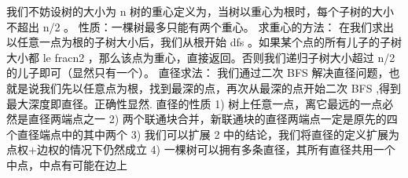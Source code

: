 {}
\markdownRendererSectionEnd \markdownRendererSectionBegin
{}\markdownRendererInterblockSeparator
{}\markdownRendererSectionBegin
{}\markdownRendererInterblockSeparator
{}我们不妨设树的大小为\markdownRendererDollarSign{} n \markdownRendererDollarSign{}\markdownRendererParagraphSeparator
{}树的重心定义为，当树以重心为根时，每个子树的大小不超出\markdownRendererDollarSign{} n/2 \markdownRendererDollarSign{}。\markdownRendererParagraphSeparator
{}性质：一棵树最多只能有两个重心。\markdownRendererParagraphSeparator
{}求重心的方法：\markdownRendererParagraphSeparator
{}在我们求出以任意一点为根的子树大小后，我们从根开始\markdownRendererDollarSign{} dfs \markdownRendererDollarSign{}。如果某个点的所有儿子的子树大小都\markdownRendererDollarSign{} \markdownRendererBackslash{}le \markdownRendererBackslash{}frac\markdownRendererLeftBrace{}n\markdownRendererRightBrace{}\markdownRendererLeftBrace{}2\markdownRendererRightBrace{} \markdownRendererDollarSign{}，那么该点为重心，直接返回。否则我们递归子树大小超过\markdownRendererDollarSign{} n/2 \markdownRendererDollarSign{}的儿子即可（显然只有一个）。\markdownRendererInterblockSeparator
{}\markdownRendererInterblockSeparator
{}
\markdownRendererSectionEnd \markdownRendererSectionBegin
{}\markdownRendererInterblockSeparator
{}直径求法：\markdownRendererParagraphSeparator
{}我们通过二次\markdownRendererDollarSign{} BFS \markdownRendererDollarSign{}解决直径问题，也就是说我们先以任意点为根，找到最深的点，再次从最深的点开始二次\markdownRendererDollarSign{} BFS\markdownRendererSoftLineBreak
{}\markdownRendererDollarSign{},得到最大深度即直径。正确性显然.\markdownRendererInterblockSeparator
{}\markdownRendererInterblockSeparator
{}直径的性质\markdownRendererParagraphSeparator
{}\markdownRendererDollarSign{} 1) \markdownRendererDollarSign{}树上任意一点，离它最远的一点必然是直径两端点之一\markdownRendererParagraphSeparator
{}\markdownRendererDollarSign{} 2) \markdownRendererDollarSign{}两个联通块合并，新联通块的直径两端点一定是原先的四个直径端点中的其中两个\markdownRendererParagraphSeparator
{}\markdownRendererDollarSign{} 3) \markdownRendererDollarSign{}我们可以扩展\markdownRendererDollarSign{} 2 \markdownRendererDollarSign{}中的结论，我们将直径的定义扩展为点权+边权的情况下仍然成立\markdownRendererParagraphSeparator
{}\markdownRendererDollarSign{} 4) \markdownRendererDollarSign{}一棵树可以拥有多条直径，其所有直径共用一个中点，中点有可能在边上\markdownRendererInterblockSeparator
